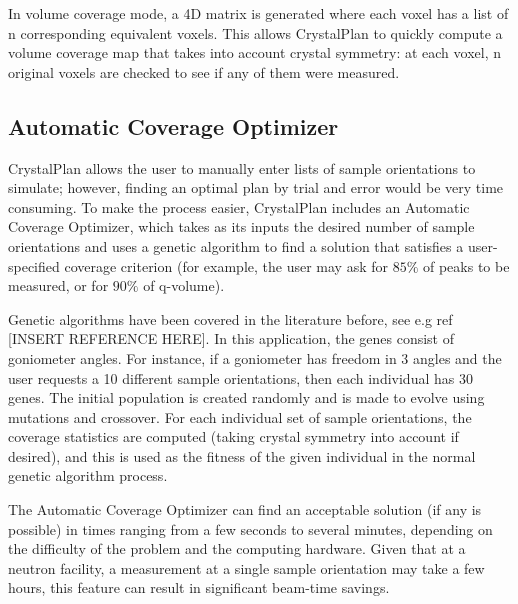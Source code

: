 \documentclass{iucr}              %
\begin{document}
In volume coverage mode, a 4D matrix is generated where each voxel has a list of
n corresponding equivalent voxels. This allows CrystalPlan to quickly compute a
volume coverage map that takes into account crystal symmetry: at each voxel, n
original voxels are checked to see if any of them were measured.         



\subsection{Automatic Coverage Optimizer}

CrystalPlan allows the user to manually enter lists of sample orientations to
simulate; however, finding an optimal plan by trial and error would be very time
consuming. To make the process easier, CrystalPlan includes an Automatic
Coverage Optimizer, which takes as its inputs the desired number of sample
orientations and uses a genetic algorithm to find a solution that satisfies a
user-specified coverage criterion (for example, the user may ask for $85\%$ of
peaks to be measured, or for $90\%$ of q-volume).           

Genetic algorithms have been covered in the literature before, see e.g ref
[INSERT REFERENCE HERE]. In this application, the genes consist of goniometer
angles. For instance, if a goniometer has freedom in 3 angles and the user
requests a 10 different sample orientations, then each individual has 30 genes.
The initial population is created randomly and is made to evolve using mutations
and crossover. For each individual set of sample orientations, the coverage
statistics are computed (taking crystal symmetry into account if desired), and
this is used as the fitness of the given individual in the normal genetic
algorithm process.             

The Automatic Coverage Optimizer can find an acceptable solution (if any is
possible) in times ranging from a few seconds to several minutes, depending on
the difficulty of the problem and the computing hardware. Given that at a
neutron facility, a measurement at a single sample orientation may take a few
hours, this feature can result in significant beam-time savings.           




\end{document}
